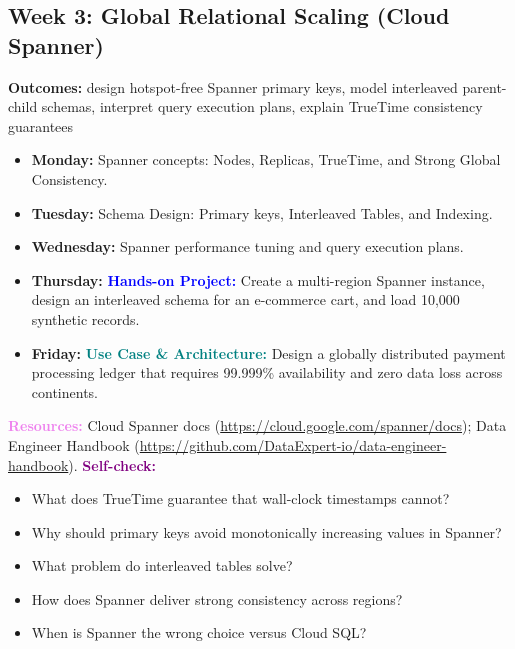 \documentclass[11pt, a4paper]{article}
\newcommand{\project}[1]{\vspace{1mm}\noindent\textbf{\textcolor{blue}{Hands-on Project:}} #1}
\newcommand{\usecase}[1]{\vspace{1mm}\noindent\textbf{\textcolor{teal}{Use Case \& Architecture:}} #1}
\newcommand{\dayitem}[2]{\item \textbf{#1:} #2}
\newcommand{\resources}[1]{\vspace{1mm}\noindent\textbf{\textcolor{violet}{Resources:}} #1}
\newcommand{\selfcheck}[1]{\vspace{1mm}\noindent\textbf{\textcolor{purple}{Self-check:}} #1}
\begin{document}
\subsection*{Week 3: Global Relational Scaling (Cloud Spanner)}
\par\noindent\textbf{Outcomes:} design hotspot-free Spanner primary keys, model interleaved parent-child schemas, interpret query execution plans, explain TrueTime consistency guarantees
\begin{itemize}[label=-]
    \dayitem{Monday}{Spanner concepts: Nodes, Replicas, TrueTime, and Strong Global Consistency.}
    \dayitem{Tuesday}{Schema Design: Primary keys, Interleaved Tables, and Indexing.}
    \dayitem{Wednesday}{Spanner performance tuning and query execution plans.}
    \dayitem{Thursday}{\project{Create a multi-region Spanner instance, design an interleaved schema for an e-commerce cart, and load 10,000 synthetic records.}}
    \dayitem{Friday}{\usecase{Design a globally distributed payment processing ledger that requires 99.999\% availability and zero data loss across continents.}}
\end{itemize}
\resources{Cloud Spanner docs (\url{https://cloud.google.com/spanner/docs}); Data Engineer Handbook (\url{https://github.com/DataExpert-io/data-engineer-handbook}).}
\selfcheck{\begin{itemize}[label=-, nosep, leftmargin=1.5em]
    \item What does TrueTime guarantee that wall-clock timestamps cannot?
    \item Why should primary keys avoid monotonically increasing values in Spanner?
    \item What problem do interleaved tables solve?
    \item How does Spanner deliver strong consistency across regions?
    \item When is Spanner the wrong choice versus Cloud SQL?
\end{itemize}}
\end{document}
